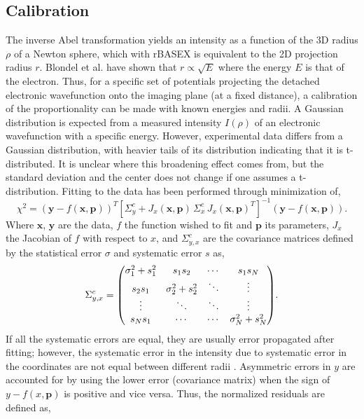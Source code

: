 \documentclass[12pt]{article}
\begin{document}
\subsection{Calibration}
The inverse Abel transformation yields an intensity as a function of the 3D radius $\rho$ of a Newton sphere, which with rBASEX is equivalent to the 2D projection radius $r$. Blondel et al. \cite{blondel_photodetachment_1998} have shown that $r\propto\sqrt{E}$ where the energy $E$ is that of the electron. Thus, for a specific set of potentials projecting the detached electronic wavefunction onto the imaging plane (at a fixed distance), a calibration of the proportionality can be made with known energies and radii. A Gaussian distribution is expected from a measured intensity $I(\rho)$ of an electronic wavefunction with a specific energy. However, experimental data differs from a Gaussian distribution, with heavier tails of its distribution indicating that it is t-distributed. It is unclear where this broadening effect comes from, but the standard deviation and the center does not change if one assumes a t-distribution. Fitting to the data has been performed through minimization of,
\begin{equation*}
    \chi^2=\left(\bm{y}-f(\bm{x},\bm{p})\right)^T\left[\Sigma^c_y+J_x(\bm{x},\bm{p})\,\Sigma^c_x\,J_x(\bm{x},\bm{p})^T\right]^{-1}\left(\bm{y}-f(\bm{x},\bm{p})\right).
\end{equation*}
Where $\bm{x}$, $\bm{y}$ are the data, $f$ the function wished to fit and $\bm{p}$ its parameters, $J_x$ the Jacobian of $f$ with respect to $x$, and $\Sigma^c_{y,x}$ are the covariance matrices defined by the statistical error $\sigma$ and systematic error $s$ as,
\begin{equation*}
    \Sigma^c_{y,x}=\mqty(\sigma^2_1 + s^2_1 & s_1s_2 & \cdots & s_1s_N\\
    s_2s_1 & \sigma^2_2 + s^2_2 & \ddots & \vdots\\
    \vdots & \ddots & \ddots & \vdots\\
    s_Ns_1 & \cdots & \cdots & \sigma^2_N + s^2_N).
\end{equation*}
If all the systematic errors are equal, they are usually error propagated after fitting; however, the systematic error in the intensity due to systematic error in the coordinates are not equal between different radii \cite{hughes_measurements_2010}. Asymmetric errors in $y$ are accounted for by using the lower error (covariance matrix) when the sign of $y-f(x,\bm{p})$ is positive and vice versa. Thus, the normalized residuals are defined as,
\end{document}
